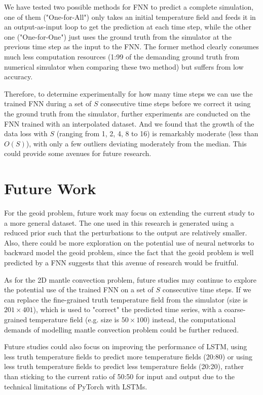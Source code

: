 We have tested two possible methods for FNN to predict a complete simulation, one of them ("One-for-All") only takes an initial temperature field and feeds it in an output-as-input loop to get the prediction at each time step, while the other one ("One-for-One") just uses the ground truth from the simulator at the previous time step as the input to the FNN. The former method clearly consumes much less computation resources (1:99 of the demanding ground truth from numerical simulator when comparing these two method) but suffers from low accuracy.

Therefore, to determine experimentally for how many time steps we can use the trained FNN during a set of $S$ consecutive time steps before we correct it using the ground truth from the simulator, further experiments are conducted on the FNN trained with an interpolated dataset. And we found that the growth of the data loss with $S$ (ranging from 1, 2, 4, 8 to 16) is remarkably moderate (less than $O(S)$), with only a few outliers deviating moderately from the median. This could provide some avenues for future research.

\section{Future Work}

For the geoid problem, future work may focus on extending the current study to a more general dataset. The one used in this research is generated using a reduced prior such that the perturbations to the output are relatively smaller. Also, there could be more exploration on the potential use of neural networks to backward model the geoid problem, since the fact that the geoid problem is well predicted by a FNN suggests that this avenue of research would be fruitful.

As for the 2D mantle convection problem, future studies may continue to explore the potential use of the trained FNN on a set of $S$ consecutive time steps. If we can replace the fine-grained truth temperature field from the simulator (size is $201 \times 401$), which is used to "correct" the predicted time series, with a coarse-grained temperature field (e.g. size is $50 \times 100$) instead, the computational demands of modelling mantle convection problem could be further reduced.

Future studies could also focus on improving the performance of LSTM, using less truth temperature fields to predict more temperature fields (20:80) or using less truth temperature fields to predict less temperature fields (20:20), rather than sticking to the current ratio of 50:50 for input and output due to the technical limitations of PyTorch with LSTMs.

